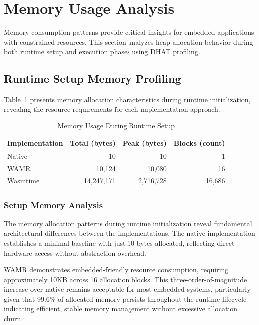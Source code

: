 \section{Memory Usage Analysis}
\label{sec:eval-memory}

Memory consumption patterns provide critical insights for embedded applications with constrained resources. This section analyzes heap allocation behavior during both runtime setup and execution phases using DHAT profiling.

\subsection{Runtime Setup Memory Profiling}
\label{subsec:memory-setup}

Table~\ref{tab:memory-setup} presents memory allocation characteristics during runtime initialization, revealing the resource requirements for each implementation approach.

\begin{table}[htbp]
    \centering
    \caption{Memory Usage During Runtime Setup}
    \label{tab:memory-setup}
    \begin{tabular}{lrrr}
        \toprule
        \textbf{Implementation} & \textbf{Total (bytes)} & \textbf{Peak (bytes)} & \textbf{Blocks (count)} \\
        \midrule
        Native        & 10          & 10        & 1 \\
        WAMR          & 10,124      & 10,080    & 16 \\
        Wasmtime      & 14,247,171  & 2,716,728 & 16,686 \\
        \bottomrule
    \end{tabular}
\end{table}

\subsubsection{Setup Memory Analysis}

The memory allocation patterns during runtime initialization reveal fundamental architectural differences between the implementations. The native implementation establishes a minimal baseline with just 10 bytes allocated, reflecting direct hardware access without abstraction overhead.

WAMR demonstrates embedded-friendly resource consumption, requiring approximately 10KB across 16 allocation blocks. This three-order-of-magnitude increase over native remains acceptable for most embedded systems, particularly given that 99.6\% of allocated memory persists throughout the runtime lifecycle—indicating efficient, stable memory management without excessive allocation churn.

